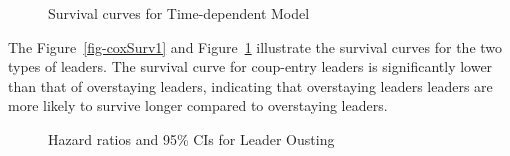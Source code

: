 \documentclass[
  12pt,
  a4paper,
  12pt]{article}
\begin{document}
\begin{figure}


\caption{\label{fig-coxSurv2}Survival curves for Time-dependent Model}

\end{figure}%

The Figure~\ref{fig-coxSurv1} and Figure~\ref{fig-coxSurv2} illustrate
the survival curves for the two types of leaders. The survival curve for
coup-entry leaders is significantly lower than that of overstaying
leaders, indicating that overstaying leaders leaders are more likely to
survive longer compared to overstaying leaders.

\begin{figure}


\caption{\label{fig-coxHR-1}Hazard ratios and 95\% CIs for Leader
Ousting}

\end{figure}%
\end{document}
